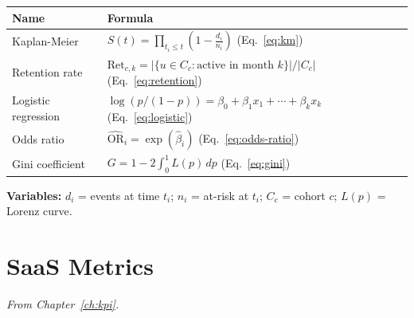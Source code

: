 \begin{tabularx}{\textwidth}{lX}
\toprule
\textbf{Name} & \textbf{Formula} \\
\midrule
Kaplan-Meier &
$\displaystyle \hat{S}(t) = \prod_{t_i \leq t}\left(1 - \frac{d_i}{n_i}\right)$
\quad (Eq.~\ref{eq:km}) \\[12pt]

Retention rate &
$\text{Ret}_{c,k} = |\{u \in C_c : \text{active in month } k\}| / |C_c|$
\quad (Eq.~\ref{eq:retention}) \\[8pt]

Logistic regression &
$\log(p/(1-p)) = \beta_0 + \beta_1 x_1 + \cdots + \beta_k x_k$
\quad (Eq.~\ref{eq:logistic}) \\[8pt]

Odds ratio &
$\widehat{\text{OR}}_i = \exp(\hat{\beta}_i)$
\quad (Eq.~\ref{eq:odds-ratio}) \\[8pt]

Gini coefficient &
$G = 1 - 2\int_0^1 L(p)\,dp$
\quad (Eq.~\ref{eq:gini}) \\
\bottomrule
\end{tabularx}

\medskip
\noindent\textbf{Variables:} $d_i$ = events at time $t_i$; $n_i$ = at-risk at $t_i$; $C_c$ = cohort $c$; $L(p)$ = Lorenz curve.

\section{SaaS Metrics}

\noindent\textit{From Chapter~\ref{ch:kpi}.}

\medskip

